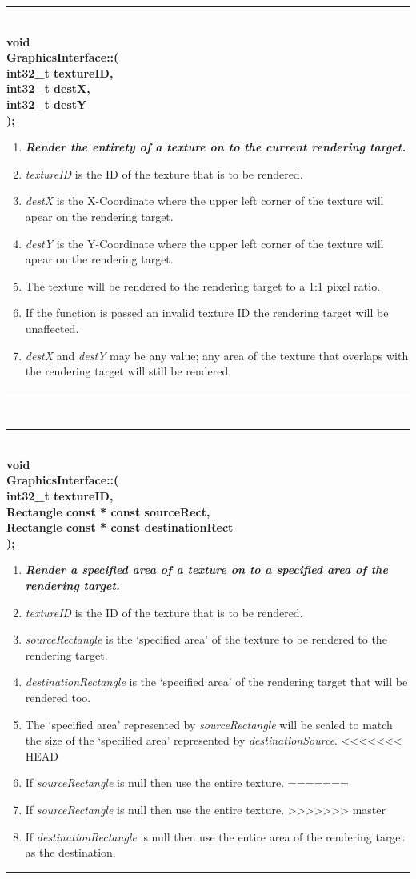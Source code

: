 \documentclass[12pt]{article}
\newcommand{\param}[1]{\indent\phantom{indent} \textbf{#1}\\ }
\newenvironment{func}[4]%
{%
	\noindent\ignorespaces
	\begin{minipage}[b]{\linewidth}
	\rule{\textwidth} {1pt} \\
	\textbf{#1\\#2::{\Large \color{blue}{#3}}(} \\
	\textbf{#4);} \\
	\noindent\ignorespaces
}%
{%
	\ignorespacesafterend
	\rule{\textwidth} {0.01pt} \\
	\end{minipage}
}
\begin{document}
\begin{func}{void}{GraphicsInterface}{basicRenderCopy}
{
	\param{int32\_t textureID,}
	\param{int32\_t destX,}
	\param{int32\_t destY}
}
\begin{enumerate}
\item[]\textit{\textbf{Render the entirety of a texture on to the current rendering target.}}
\item \textit{textureID} is the ID of the texture that is to be rendered.
\item \textit{destX} is the X-Coordinate where the upper left corner of the texture will apear on the rendering target.
\item \textit{destY} is the Y-Coordinate where the upper left corner of the texture will apear on the rendering target.
\item The texture will be rendered to the rendering target to a 1:1 pixel ratio.
\item If the function is passed an invalid texture ID the rendering target will be unaffected.
\item \textit{destX} and \textit{destY} may be any value; any area of the texture that overlaps with the rendering target will still be rendered.
\end{enumerate}
\end{func}

\begin{func}{void}{GraphicsInterface}{renderCopy}
{
	\param{int32\_t textureID,}
	\param{Rectangle const * const sourceRect,}
	\param{Rectangle const * const destinationRect}
}
\begin{enumerate}
\item[]\textit{\textbf{Render a specified area of a texture on to a specified area of the rendering target.}}
\item \textit{textureID} is the ID of the texture that is to be rendered.
\item \textit{sourceRectangle} is the `specified area' of the texture to be rendered to the rendering target.
\item \textit{destinationRectangle} is the `specified area' of the rendering target that will be rendered too.
\item The `specified area' represented by \textit{sourceRectangle} will be scaled to match the size of the `specified area' represented by \textit{destinationSource}.
<<<<<<< HEAD
\item If \textit{sourceRectangle} is null then use the entire texture. {\color{red}{(?-)}}
=======
\item If \textit{sourceRectangle} is null then use the entire texture. {\color{red}{(?)}}
>>>>>>> master
\item If \textit{destinationRectangle} is null then use the entire area of the rendering target as the destination. {\color{red}{(?)}}
\end{enumerate}
\end{func}
\end{document}
